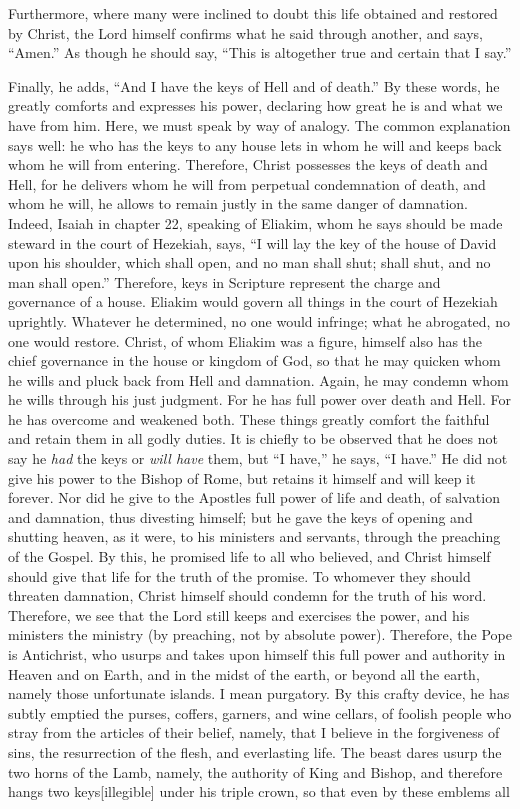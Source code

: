 Furthermore, where many were inclined to doubt this life obtained and restored by Christ, the Lord himself confirms what he said through another, and says, “Amen.” As though he should say, “This is altogether true and certain that I say.”

Finally, he adds, “And I have the keys of Hell and of death.” By these words, he greatly comforts and expresses his power, declaring how great he is and what we have from him. Here, we must speak by way of analogy. The common explanation says well: he who has the keys to any house lets in whom he will and keeps back whom he will from entering. Therefore, Christ possesses the keys of death and Hell, for he delivers whom he will from perpetual condemnation of death, and whom he will, he allows to remain justly in the same danger of damnation. Indeed, Isaiah in chapter 22, speaking of Eliakim, whom he says should be made steward in the court of Hezekiah, says, “I will lay the key of the house of David upon his shoulder, which shall open, and no man shall shut; shall shut, and no man shall open.” Therefore, keys in Scripture represent the charge and governance of a house. Eliakim would govern all things in the court of Hezekiah uprightly. Whatever he determined, no one would infringe; what he abrogated, no one would restore. Christ, of whom Eliakim was a figure, himself also has the chief governance in the house or kingdom of God, so that he may quicken whom he wills and pluck back from Hell and damnation. Again, he may condemn whom he wills through his just judgment. For he has full power over death and Hell. For he has overcome and weakened both. These things greatly comfort the faithful and retain them in all godly duties. It is chiefly to be observed that he does not say he \textit{had} the keys or \textit{will have} them, but “I have,” he says, “I have.” He did not give his power to the Bishop of Rome, but retains it himself and will keep it forever. Nor did he give to the Apostles full power of life and death, of salvation and damnation, thus divesting himself; but he gave the keys of opening and shutting heaven, as it were, to his ministers and servants, through the preaching of the Gospel. By this, he promised life to all who believed, and Christ himself should give that life for the truth of the promise. To whomever they should threaten damnation, Christ himself should condemn for the truth of his word. Therefore, we see that the Lord still keeps and exercises the power, and his ministers the ministry (by preaching, not by absolute power). Therefore, the Pope is Antichrist, who usurps and takes upon himself this full power and authority in Heaven and on Earth, and in the midst of the earth, or beyond all the earth, namely those unfortunate islands. I mean purgatory. By this crafty device, he has subtly emptied the purses, coffers, garners, and wine cellars, of foolish people who stray from the articles of their belief, namely, that I believe in the forgiveness of sins, the resurrection of the flesh, and everlasting life. The beast dares usurp the two horns of the Lamb, namely, the authority of King and Bishop, and therefore hangs two keys[illegible] under his triple crown, so that even by these emblems all 
